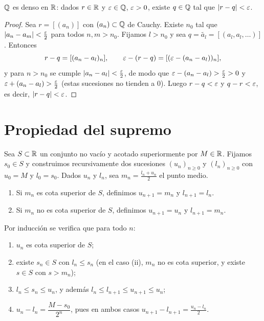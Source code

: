 \begin{theorem}
  \(\mathbb{Q}\) es denso en \(\mathbb{R}\): dados \(r \in \mathbb{R}\) y \(\varepsilon \in \mathbb{Q}\), \(\varepsilon > 0\), existe \(q \in \mathbb{Q}\) tal que \(|r - q| < \varepsilon\).
\end{theorem}

\begin{proof}
  Sea \(r = [(a_n)]\) con \((a_n) \subset \mathbb{Q}\) de Cauchy. Existe \(n_0\) tal que \(|a_n - a_m| < \frac{\varepsilon}{2}\) para todos \(n, m > n_0\). Fijamos \(l > n_0\) y sea \(q = \tilde{a_l} = [(a_l, a_l, \dots)]\). Entonces
  \[
    r - q = [(a_n - a_l)_n], \qquad \varepsilon - (r - q) = [(\varepsilon - (a_n - a_l))_n],
  \]
  y para \(n > n_0\) se cumple \(|a_n - a_l| < \frac{\varepsilon}{2}\), de modo que \(\varepsilon - (a_n - a_l) > \frac{\varepsilon}{2} > 0\) y \(\varepsilon + (a_n - a_l) > \frac{\varepsilon}{2}\) (estas sucesiones no tienden a \(0\)). Luego \(r - q < \varepsilon\) y \(q - r < \varepsilon\), es decir, \(|r - q| < \varepsilon\).
\end{proof}

\section{Propiedad del supremo}

Sea \(S \subset \mathbb{R}\) un conjunto no vacío y acotado superiormente por \(M \in \mathbb{R}\). Fijamos \(s_0 \in S\) y construimos recursivamente dos sucesiones \((u_n)_{n \geq 0}\) y \((l_n)_{n \geq 0}\) con \(u_0 = M\) y \(l_0 = s_0\). Dados \(u_n\) y \(l_n\), sea \(m_n = \frac{l_n + u_n}{2}\) el punto medio.
\begin{enumerate}[label=(\roman*)]
  \item Si \(m_n\) es cota superior de \(S\), definimos \(u_{n+1} = m_n\) y \(l_{n+1} = l_n\).
  \item Si \(m_n\) no es cota superior de \(S\), definimos \(u_{n+1} = u_n\) y \(l_{n+1} = m_n\).
\end{enumerate}

Por inducción se verifica que para todo \(n\):
\begin{enumerate}[label=(\alph*)]
  \item \(u_n\) es cota superior de \(S\);
  \item existe \(s_n \in S\) con \(l_n \leq s_n\) (en el caso (ii), \(m_n\) no es cota superior, y existe \(s \in S\) con \(s > m_n\));
  \item \(l_n \leq s_n \leq u_n\), y además \(l_n \leq l_{n+1} \leq u_{n+1} \leq u_n\);
  \item \(u_n - l_n = \dfrac{M - s_0}{2^n}\), pues en ambos casos \(u_{n+1} - l_{n+1} = \frac{u_n - l_n}{2}\).
\end{enumerate}

